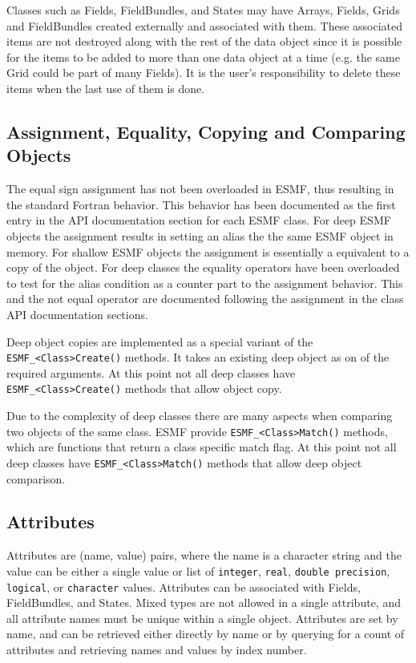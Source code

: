 Classes such as Fields, FieldBundles, and States may have Arrays, 
Fields, Grids and FieldBundles created externally and associated with
them.  These associated items are not destroyed along with the rest  
of the data object since it is possible for the items to be added 
to more than one data object at a time (e.g. the same Grid could 
be part of many Fields).  It is the user's responsibility to delete 
these items when the last use of them is done.

\subsection{Assignment, Equality, Copying and Comparing Objects}

The equal sign assignment has not been overloaded in ESMF, thus resulting in
the standard Fortran behavior. This behavior has been documented as the first
entry in the API documentation section for each ESMF class. For deep ESMF
objects the assignment results in setting an alias the the same ESMF object
in memory. For shallow ESMF objects the assignment is essentially a equivalent
to a copy of the object. For deep classes the equality operators have been
overloaded to test for the alias condition as a counter part to the assignment
behavior. This and the not equal operator are documented following the
assignment in the class API documentation sections. 

\begin{sloppypar}
Deep object copies are implemented as a special variant of the
{\tt ESMF\_<Class>Create()} methods. It takes an existing deep object as
on of the required arguments. At this point not all deep classes have
{\tt ESMF\_<Class>Create()} methods that allow object copy.
\end{sloppypar}

Due to the complexity of deep classes there are many aspects when comparing two
objects of the same class. ESMF provide {\tt ESMF\_<Class>Match()} methods,
which are functions that return a class specific match flag. At this point not
all deep classes have {\tt ESMF\_<Class>Match()} methods that allow deep object
comparison.

\subsection{Attributes}

Attributes are (name, value) pairs, where
the name is a character string and the value can be either a single
value or list of {\tt integer}, {\tt real}, {\tt double precision},
{\tt logical}, or {\tt character} values.
Attributes can be associated with Fields, FieldBundles, and States. 
Mixed types are not allowed in a single attribute, and all attribute
names must be unique within a single object.    Attributes are set
by name, and can be retrieved either directly by name or by querying
for a count of attributes and retrieving names and values
by index number.

